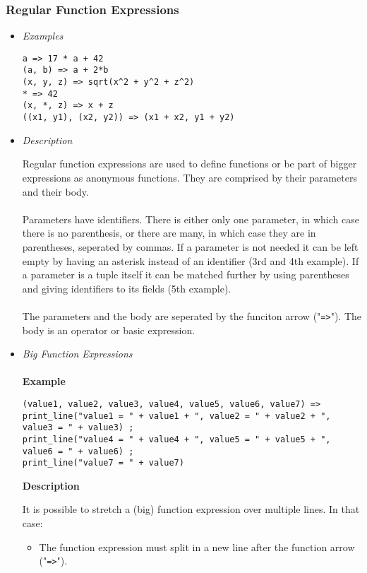 \documentclass{article}
\begin{document}
\subsubsection{Regular Function Expressions}

\begin{itemize}
\item \textit{Examples}

\begin{verbatim}
a => 17 * a + 42
(a, b) => a + 2*b
(x, y, z) => sqrt(x^2 + y^2 + z^2)
* => 42
(x, *, z) => x + z
((x1, y1), (x2, y2)) => (x1 + x2, y1 + y2)
\end{verbatim}

\item \textit{Description}

Regular function expressions are used to define functions or be part of bigger
expressions as anonymous functions. They are comprised by their parameters and
their body.
\\\\
Parameters have identifiers. There is either only one parameter, in which case
there is no parenthesis, or there are many, in which case they are in
parentheses, seperated by commas. If a parameter is not needed it can be left
empty by having an asterisk instead of an identifier (3rd and 4th example).
If a parameter is a tuple itself it can be matched further by using parentheses
and giving identifiers to its fields (5th example).
\\\\
The parameters and the body are seperated by the funciton arrow
("\texttt{=>}"). The body is an operator or basic expression.

\item \textit{Big Function Expressions}\\\\
\textbf{Example}

\begin{verbatim}
(value1, value2, value3, value4, value5, value6, value7) => 
print_line("value1 = " + value1 + ", value2 = " + value2 + ", value3 = " + value3) ;
print_line("value4 = " + value4 + ", value5 = " + value5 + ", value6 = " + value6) ;
print_line("value7 = " + value7)
\end{verbatim}

\textbf{Description}

It is possible to stretch a (big) function expression over multiple lines.
In that case:
\begin{itemize}
\item
The function expression must split in a new line after the function arrow
("\texttt{=>}").


\end{itemize}
\end{itemize}
\end{document}
